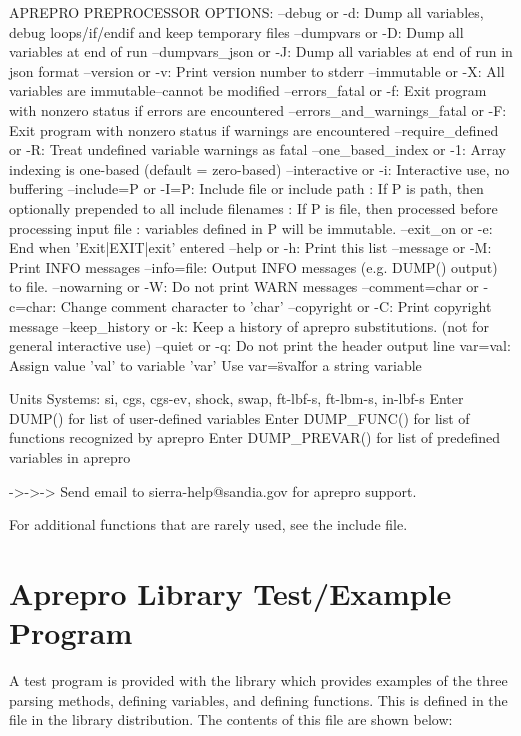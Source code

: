 \begin{apout}
APREPRO PREPROCESSOR OPTIONS:
  --debug or -d: Dump all variables, debug loops/if/endif and keep temporary files
       --dumpvars or -D: Dump all variables at end of run
  --dumpvars_json or -J: Dump all variables at end of run in json format
        --version or -v: Print version number to stderr
      --immutable or -X: All variables are immutable--cannot be modified
   --errors\_fatal or -f: Exit program with nonzero status if errors are encountered
 --errors\_and\_warnings_fatal or -F: Exit program with nonzero status if warnings are encountered
--require\_defined or -R: Treat undefined variable warnings as fatal
--one\_based\_index or -1: Array indexing is one-based (default = zero-based)
    --interactive or -i: Interactive use, no buffering
    --include=P or -I=P: Include file or include path
                       : If P is path, then optionally prepended to all include filenames
                       : If P is file, then processed before processing input file
                       : variables defined in P will be immutable.
       --exit\_on or -e: End when 'Exit|EXIT|exit' entered
           --help or -h: Print this list
        --message or -M: Print INFO messages
            --info=file: Output INFO messages (e.g. DUMP() output) to file.
      --nowarning or -W: Do not print WARN messages
--comment=char or -c=char: Change comment character to 'char'
      --copyright or -C: Print copyright message
  --keep\_history or -k: Keep a history of aprepro substitutions.
                         (not for general interactive use)
          --quiet or -q: Do not print the header output line
                var=val: Assign value 'val' to variable 'var'
                         Use var=\"sval\" for a string variable

	Units Systems: si, cgs, cgs-ev, shock, swap, ft-lbf-s, ft-lbm-s, in-lbf-s
	Enter {DUMP()} for list of user-defined variables
	Enter {DUMP_FUNC()} for list of functions recognized by aprepro
	Enter {DUMP_PREVAR()} for list of predefined variables in aprepro

	->->-> Send email to sierra-help@sandia.gov for aprepro support.
\end{apout}

For additional functions that are rarely used, see the
 include file.

\section{Aprepro Library Test/Example Program}
A test program is provided with the \aprepro{} library which provides
examples of the three parsing methods, defining variables, and
defining functions.  This is defined in the  file in
the \aprepro{} library distribution. The contents of this file are
shown below:



